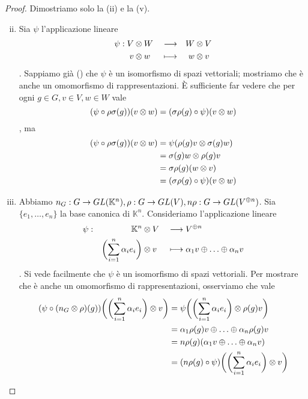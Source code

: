 \begin{proof}
Dimostriamo solo la (ii) e la (v).
\begin{enumerate}[(i)]
\setcounter{enumi}{1}
\item Sia $\psi$ l'applicazione lineare
\begin{alignat*}{3}
\psi:V&\otimes W&&\longrightarrow &W&\otimes V\\
v&\otimes w&&\longmapsto &w&\otimes v
\end{alignat*}
. Sappiamo già () che $\psi$ è un isomorfismo di spazi vettoriali; mostriamo che è anche un omomorfismo di rappresentazioni. È sufficiente far vedere che per ogni $g\in G\comma v\in V\comma w\in W$ vale
$$
(\psi\circ\rho\sigma(g))(v\otimes w)=(\sigma\rho(g)\circ\psi)(v\otimes w)
$$
, ma
\begin{align*}
(\psi\circ\rho\sigma(g))(v\otimes w)&=\psi(\rho(g)v\otimes\sigma(g)w)\\
&=\sigma(g)w\otimes\rho(g)v\\
&=\sigma\rho(g)(w\otimes v)\\
&=(\sigma\rho(g)\circ\psi)(v\otimes w)
\end{align*}

\setcounter{enumi}{4}
\item Abbiamo $n_G:G\to GL(\mathbb{K}^n),\allowbreak\rho:G\to GL(V),\allowbreak n\rho:G\to GL(V^{\oplus n})$. Sia $\{e_1,\ldots,e_n\}$ la base canonica di $\mathbb{K}^n$. Consideriamo l'applicazione lineare
\begin{alignat*}{3}
\psi:&&\mathbb{K}^n&\otimes V&&\longrightarrow V^{\oplus n}\\
&&\biggl(\sum_{i=1}^{n}\alpha_ie_i\biggr)&\otimes v&&\longmapsto\alpha_1v\oplus\ldots\oplus\alpha_nv
\end{alignat*}
. Si vede facilmente che $\psi$ è un isomorfismo di spazi vettoriali. Per mostrare che è anche un omomorfismo di rappresentazioni, osserviamo che vale
\begin{align*}
(\psi\circ(n_G\otimes\rho)(g))\biggl(\biggl(\sum_{i=1}^{n}\alpha_ie_i\biggr)\otimes v\biggr)
&=\psi\biggl(\biggl(\sum_{i=1}^{n}\alpha_ie_i\biggr)\otimes\rho(g)v\biggr)\\
&=\alpha_1\rho(g)v\oplus\ldots\oplus\alpha_n\rho(g)v\\
&=n\rho(g)(\alpha_1v\oplus\ldots\oplus\alpha_nv)\\
&=(n\rho(g)\circ\psi)\biggl(\biggl(\sum_{i=1}^{n}\alpha_ie_i\biggr)\otimes v\biggr)
\end{align*}
\end{enumerate}
\end{proof}


